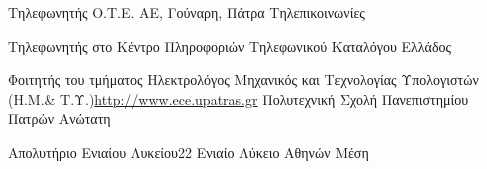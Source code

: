 \documentclass[arial, greek, nologo, notitle, totpages]{europecv2013}
\begin{document}
\begin{europecv}
	{Τηλεφωνητής}
    {Ο.Τ.Ε. ΑΕ, Γούναρη, Πάτρα}
    {Τηλεπικοινωνίες}
    {
    \begin{small}
    	Τηλεφωνητής στο Κέντρο Πληροφοριών Τηλεφωνικού Καταλόγου Ελλάδος
	\end{small}
    }



	{Φοιτητής του τμήματος Ηλεκτρολόγος Μηχανικός και Τεχνολογίας Υπολογιστών (Η.Μ.\& Τ.Υ.)\vfill \foreignlanguage{english}{\tiny \url{http://www.ece.upatras.gr}}}
    {Πολυτεχνική Σχολή Πανεπιστημίου Πατρών}
    {Ανώτατη}
    {}

	{Απολυτήριο Ενιαίου Λυκείου}{22 Ενιαίο Λύκειο Αθηνών}
    {Μέση}
    {}


\ecvlanguageheader{(*)}
\ecvlanguagefooter[10pt]{(*)}





\end{europecv}
\end{document}

